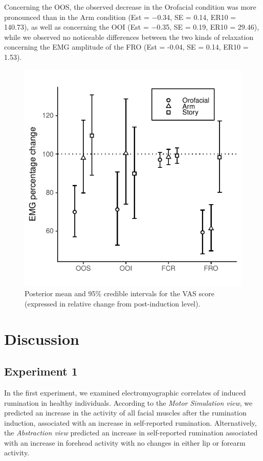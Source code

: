 \documentclass[a4paper,12pt,twoside,openright,oldfontcommands]{memoir}
\begin{document}
Concerning the OOS, the observed decrease in the Orofacial condition was
more pronounced than in the Arm condition (Est = −0.34, SE = 0.14, ER10
= 140.73), as well as concerning the OOI (Est = −0.35, SE = 0.19, ER10 =
29.46), while we observed no noticeable differences between the two
kinds of relaxation concerning the EMG amplitude of the FRO (Est =
-0.04, SE = 0.14, ER10 = 1.53).

\begin{figure}[H]

{\centering \includegraphics[width=0.75\linewidth]{assets/emg_fig3} 

}

\caption{Posterior mean and 95\% credible intervals for the VAS score (expressed in relative change from post-induction level).}\label{fig:resultsemgfig3}
\end{figure}

\section{Discussion}\label{discussion}

\subsection{Experiment 1}\label{experiment-1}

In the first experiment, we examined electromyographic correlates of
induced rumination in healthy individuals. According to the \emph{Motor
Simulation view}, we predicted an increase in the activity of all facial
muscles after the rumination induction, associated with an increase in
self-reported rumination. Alternatively, the \emph{Abstraction view}
predicted an increase in self-reported rumination associated with an
increase in forehead activity with no changes in either lip or forearm
activity.
\end{document}
